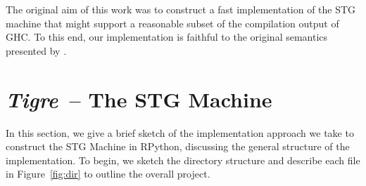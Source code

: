 \documentclass[preprint]{sigplanconf}
\begin{document}
The original aim of this work was to construct a fast implementation of the
STG machine that might support a reasonable subset of the compilation output
of GHC. To this end, our implementation is faithful to the original semantics
presented by \citet{spj:stgmachine}.

\section{\emph{Tigre}~-- The STG Machine} %

In this section, we give a brief sketch of the implementation approach we take
to construct the STG Machine in RPython, discussing the general structure of the
implementation. To begin, we sketch the directory structure and describe each file
in Figure~\ref{fig:dir} to outline the overall project.
\end{document}
